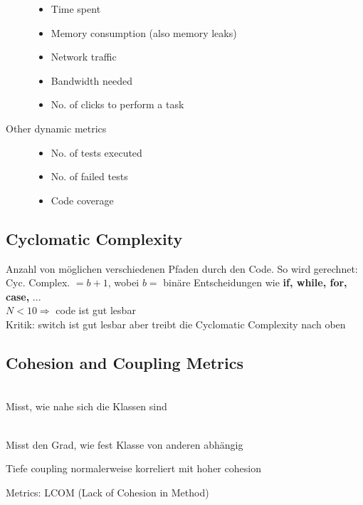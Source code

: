\documentclass[a4paper,10pt]{article}
\newcommand{\Bold}[1]{\textbf{#1}} %
\newcommand{\Ra}{\Rightarrow}
\begin{document}
\begin{description}
		\begin{itemize}
			\item Time spent
			\item Memory consumption (also memory leaks)
			\item Network traffic
			\item Bandwidth needed
			\item No. of clicks to perform a task
		\end{itemize}
	\item[Other dynamic metrics] \hfill 
		\begin{itemize}
			\item No. of tests executed
			\item No. of failed tests
			\item Code coverage
		\end{itemize}
\end{description}

\subsection{Cyclomatic Complexity}
Anzahl von m\"{o}glichen verschiedenen Pfaden durch den Code. So wird gerechnet:
Cyc. Complex. $= b + 1$, wobei $b =$ bin\"{a}re Entscheidungen wie \Bold {if, while, for, case,} ...\\
$N < 10 \Ra $ code ist gut lesbar\\
Kritik: switch ist gut lesbar aber treibt die Cyclomatic Complexity nach oben

\subsection{Cohesion and Coupling Metrics}
\begin{description}
	\item[Cohesion] \hfill \\
		Misst, wie nahe sich die Klassen sind
	\item[Coupling / Dependency] \hfill \\
		Misst den Grad, wie fest Klasse von anderen abh\"{a}ngig
	\item Tiefe coupling normalerweise korreliert mit hoher cohesion
	\item Metrics: LCOM (Lack of Cohesion in Method)
\end{description}
\end{document}
